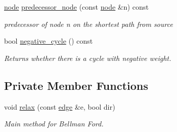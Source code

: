 \begin{DoxyCompactItemize}
\mbox{\hyperlink{classnode}{node}} \mbox{\hyperlink{classbellman__ford_a403e286ec8cbe3c30a7a729c5041155e}{predecessor\+\_\+node}} (const \mbox{\hyperlink{classnode}{node}} \&n) const
\begin{DoxyCompactList}\small\item\em predecessor of node {\itshape n} on the shortest path from source \end{DoxyCompactList}\item 
bool \mbox{\hyperlink{classbellman__ford_af9cd8be38bb1504089997581d9aa4f64}{negative\+\_\+cycle}} () const
\begin{DoxyCompactList}\small\item\em Returns whether there is a cycle with negative weight. \end{DoxyCompactList}\end{DoxyCompactItemize}
\subsection*{Private Member Functions}
\begin{DoxyCompactItemize}
\item 
void \mbox{\hyperlink{classbellman__ford_a7beb9204dc5bc65ed880a044a5aad81b}{relax}} (const \mbox{\hyperlink{classedge}{edge}} \&e, bool dir)
\begin{DoxyCompactList}\small\item\em Main method for Bellman Ford. \end{DoxyCompactList}\end{DoxyCompactItemize}
